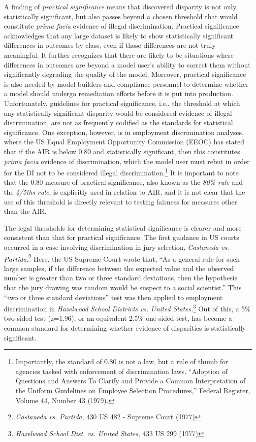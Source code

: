 \documentclass[information,article,submit,moreauthors,pdftex]{definitions/mdpi}
\begin{document}
A finding of \textit{practical significance} means that discovered disparity is not only statistically significant, but also passes beyond a chosen threshold that would constitute \textit{prima facia} evidence of illegal discrimination.  Practical significance acknowledges that any large dataset is likely to show statistically significant differences in outcomes by class, even if those differences are not truly meaningful.  It further recognizes that there are likely to be situations where differences in outcomes are beyond a model user’s ability to correct them without significantly degrading the quality of the model. Moreover, practical significance is also needed by model builders and compliance personnel to determine whether a model should undergo remediation efforts before it is put into production. Unfortunately, guidelines for practical significance, i.e., the threshold at which any statistically significant disparity would be considered evidence of illegal discrimination, are not as frequently codified as the standards for statistical significance.  One exception, however, is in employment discrimination analyses, where the US Equal Employment Opportunity Commission (EEOC) has stated that if the AIR is below 0.80 and statistically significant, then this constitutes \textit{prima facia} evidence of discrimination, which the model user must rebut in order for the DI not to be considered illegal discrimination.\footnote{Importantly, the standard of 0.80 is not a law, but a rule of thumb for agencies tasked with enforcement of discrimination laws.  ``Adoption of Questions and Answers To Clarify and Provide a Common Interpretation of the Uniform Guidelines on Employee Selection Procedures,'' Federal Register, Volume 44, Number 43 (1979).} It is important to note that the 0.80 measure of practical significance, also known as the \textit{80\% rule} and the \textit{4/5ths rule}, is explicitly used in relation to AIR, and it is not clear that the use of this threshold is directly relevant to testing fairness for measures other than the AIR.

The legal thresholds for determining statistical significance is clearer and more consistent than that for practical significance.  The first guidance in US courts occurred in a case involving discrimination in jury selection, \textit{Castaneda vs. Partida}.\footnote{\textit{Castaneda vs. Partida}, 430 US 482 - Supreme Court (1977)}   Here, the US Supreme Court wrote that, ``As a general rule for such large samples, if the difference between the expected value and the observed number is greater than two or three standard deviations, then the hypothesis that the jury drawing was random would be suspect to a social scientist.''  This ``two or three standard deviations'' test was then applied to employment discrimination in \textit{Hazelwood School Districts vs. United States.}\footnote{\textit{Hazelwood School Dist. vs. United States}, 433 US 299 (1977)} Out of this, a 5\% two-sided test (z=1.96), or an equivalent 2.5\% one-sided test, has become a common standard for determining whether evidence of disparities is statistically significant.
\end{document}
